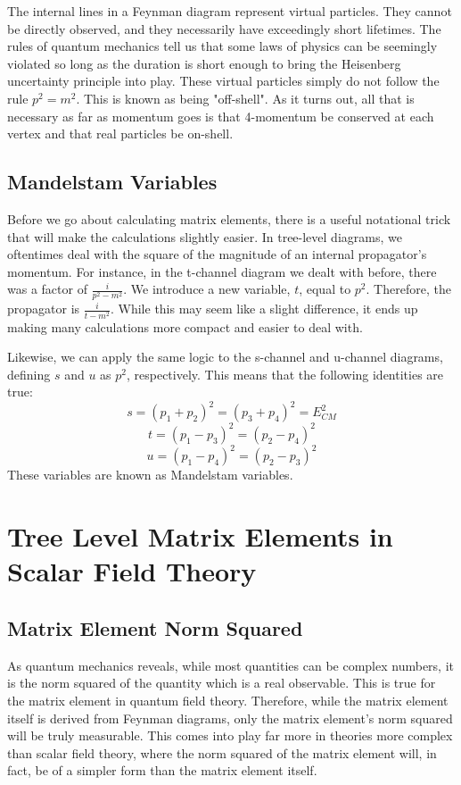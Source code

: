\documentclass{report}
\begin{document}
The internal lines in a Feynman diagram represent virtual particles. They cannot be directly observed, and they necessarily have exceedingly short lifetimes. The rules of quantum mechanics tell us that some laws of physics can be seemingly violated so long as the duration is short enough to bring the Heisenberg uncertainty principle into play. These virtual particles simply do not follow the rule $p^2 = m^2$. This is known as being "off-shell". As it turns out, all that is necessary as far as momentum goes is that 4-momentum be conserved at each vertex and that real particles be on-shell.

\section{Mandelstam Variables}
Before we go about calculating matrix elements, there is a useful notational trick that will make the calculations slightly easier. In tree-level diagrams, we oftentimes deal with the square of the magnitude of an internal propagator's momentum. For instance, in the t-channel diagram we dealt with before, there was a factor of $\frac{i}{p^2 - m^2}$. We introduce a new variable, $t$, equal to $p^2$. Therefore, the propagator is $\frac{i}{t - m^2}$. While this may seem like a slight difference, it ends up making many calculations more compact and easier to deal with.

Likewise, we can apply the same logic to the s-channel and u-channel diagrams, defining $s$ and $u$ as $p^2$, respectively. This means that the following identities are true:
\[
s = (p_1 + p_2)^2 = (p_3 + p_4)^2 = E_{CM}^2
\]
\[
t = (p_1 - p_3)^2 = (p_2 - p_4)^2
\]
\[
u = (p_1 - p_4)^2 = (p_2 - p_3)^2
\]
These variables are known as Mandelstam variables.

\chapter{Tree Level Matrix Elements in Scalar Field Theory}
\section{Matrix Element Norm Squared}
As quantum mechanics reveals, while most quantities can be complex numbers, it is the norm squared of the quantity which is a real observable. This is true for the matrix element in quantum field theory. Therefore, while the matrix element itself is derived from Feynman diagrams, only the matrix element's norm squared will be truly measurable. This comes into play far more in theories more complex than scalar field theory, where the norm squared of the matrix element will, in fact, be of a simpler form than the matrix element itself.
\end{document}
